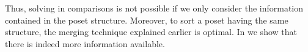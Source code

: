 Thus, solving \XY in  comparisons is not possible if we only
consider the information contained in the poset structure. Moreover, to sort a
poset having the same structure, the merging technique explained earlier is
optimal. In  we show that there is indeed more
information available.
